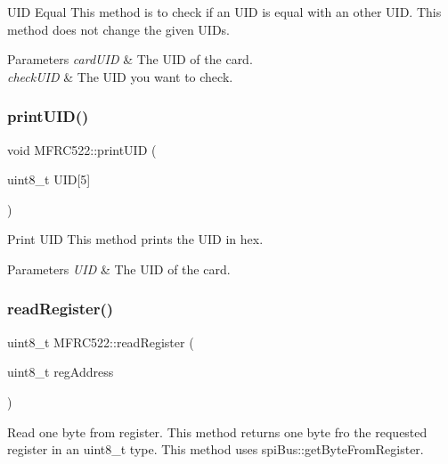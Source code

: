 U\+ID Equal  This method is to check if an U\+ID is equal with an other U\+ID. This method does not change the given U\+ID\textquotesingle{}s. 


\begin{DoxyParams}{Parameters}
{\em card\+U\+ID} & The U\+ID of the card. \\
\hline
{\em check\+U\+ID} & The U\+ID you want to check. \\
\hline
\end{DoxyParams}
\mbox{\label{classMFRC522_af640b9f28937dc630a7482fc2aaf505f}} 
\subsubsection{\texorpdfstring{print\+U\+I\+D()}{printUID()}}
{\footnotesize\ttfamily void M\+F\+R\+C522\+::print\+U\+ID (\begin{DoxyParamCaption}\item[{uint8\+\_\+t}]{U\+ID\mbox{[}5\mbox{]} }\end{DoxyParamCaption})}



Print U\+ID  This method prints the U\+ID in hex. 


\begin{DoxyParams}{Parameters}
{\em U\+ID} & The U\+ID of the card. \\
\hline
\end{DoxyParams}
\mbox{\label{classMFRC522_acf84c1c99926ebeffb31480c12492b31}} 
\subsubsection{\texorpdfstring{read\+Register()}{readRegister()}\hspace{0.1cm}{\footnotesize\ttfamily [1/2]}}
{\footnotesize\ttfamily uint8\+\_\+t M\+F\+R\+C522\+::read\+Register (\begin{DoxyParamCaption}\item[{uint8\+\_\+t}]{reg\+Address }\end{DoxyParamCaption})}



Read one byte from register.  This method returns one byte fro the requested register in an uint8\+\_\+t type. This method uses spi\+Bus\+::get\+Byte\+From\+Register. 


